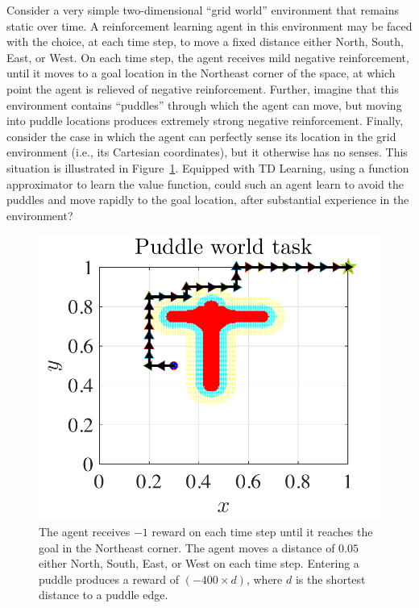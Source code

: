 \documentclass[preprint,12pt,authoryear]{elsarticle}
\begin{document}
Consider a very simple two-dimensional ``grid world'' environment that
remains static over time. A reinforcement learning agent in this
environment may be faced with the choice, at each time step, to move a
fixed distance either North, South, East, or West. On each time step,
the agent receives mild negative reinforcement, until it moves to a
goal location in the Northeast corner of the space, at which point the
agent is relieved of negative reinforcement. Further, imagine that
this environment contains ``puddles'' through which the agent can
move, but moving into puddle locations produces extremely strong
negative reinforcement. Finally, consider the case in which the agent
can perfectly sense its location in the grid environment (i.e., its
Cartesian coordinates), but it otherwise has no senses. This situation
is illustrated in Figure~\ref{puddleworld}. Equipped with TD Learning,
using a function approximator to learn the value function, could such
an agent learn to avoid the puddles and move rapidly to the goal
location, after substantial experience in the environment?

\begin{figure}
\begin{center}
\includegraphics[scale=0.5]{figures/puddleworld.pdf}
\end{center}
\vspace{-4mm}
\caption{The agent receives $-1$ reward on each time step until it
         reaches the goal in the Northeast corner. The agent moves a
         distance of $0.05$ either North, South, East, or West on each
         time step. Entering a puddle produces a reward of $(-400
         \times d)$, where $d$ is the shortest distance to a puddle
         edge.}
\label{puddleworld}
\end{figure}
\end{document}
